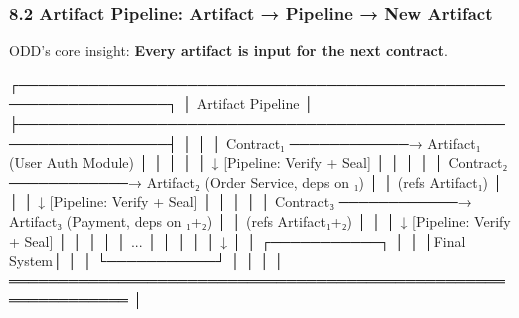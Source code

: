 \documentclass[
]{article}
\newenvironment{Shaded}{}{}
\newcommand{\NormalTok}[1]{#1}
\begin{document}
\hypertarget{82-artifact-pipeline-artifact-ux2192-pipeline-ux2192-new-artifact}{%
\subsubsection{8.2 Artifact Pipeline: Artifact → Pipeline → New
Artifact}\label{82-artifact-pipeline-artifact-ux2192-pipeline-ux2192-new-artifact}}

ODD's core insight: \textbf{Every artifact is input for the next
contract}.

\begin{Shaded}
\begin{Highlighting}[]
\NormalTok{┌─────────────────────────────────────────────────────────────────┐}
\NormalTok{│                     Artifact Pipeline                            │}
\NormalTok{├─────────────────────────────────────────────────────────────────┤}
\NormalTok{│                                                                  │}
\NormalTok{│  Contract₁ ────────────→ Artifact₁ (User Auth Module)           │}
\NormalTok{│                              │                                   │}
\NormalTok{│                              ↓ [Pipeline: Verify + Seal]         │}
\NormalTok{│                              │                                   │}
\NormalTok{│  Contract₂ ────────────→ Artifact₂ (Order Service, deps on ₁)   │}
\NormalTok{│       (refs Artifact₁)       │                                   │}
\NormalTok{│                              ↓ [Pipeline: Verify + Seal]         │}
\NormalTok{│                              │                                   │}
\NormalTok{│  Contract₃ ────────────→ Artifact₃ (Payment, deps on ₁+₂)       │}
\NormalTok{│       (refs Artifact₁+₂)     │                                   │}
\NormalTok{│                              ↓ [Pipeline: Verify + Seal]         │}
\NormalTok{│                              │                                   │}
\NormalTok{│                             ...                                  │}
\NormalTok{│                              │                                   │}
\NormalTok{│                              ↓                                   │}
\NormalTok{│                        ┌───────────┐                            │}
\NormalTok{│                        │Final System│                            │}
\NormalTok{│                        └───────────┘                            │}
\NormalTok{│                                                                  │}
\NormalTok{│  ══════════════════════════════════════════════════════════════  │}

\end{Highlighting}
\end{Shaded}
\end{document}
